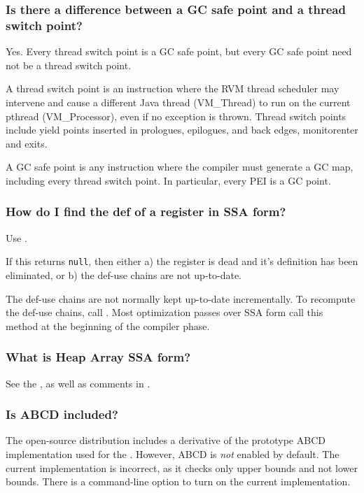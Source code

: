 \subsubsection{Is there a difference between a GC safe point and a thread
switch point?}

Yes.  Every thread switch point is a GC safe point, but every GC safe point 
need not be a thread switch point.

A thread switch point is an instruction where the RVM thread scheduler may
intervene and cause a different Java thread (VM\_Thread) to run on the current
pthread (VM\_Processor), even if no exception is thrown.  
Thread switch points include yield points inserted in prologues, epilogues, 
and back edges, monitorenter and exits.

A GC safe point is any instruction where the compiler must generate a GC map, 
including every thread switch point.  In particular, every 
PEI is a GC point.

\subsubsection{How do I find the def of a register in SSA form?}

Use 
.

If this returns {\tt null}, then either a) the register is dead and it's definition has been eliminated, or b) the def-use chains are not up-to-date.

The def-use chains are not normally kept up-to-date incrementally.  To
recompute the def-use chains, call 
. 
Most optimization passes over SSA form call this method at 
the beginning of the compiler phase.

\subsubsection{What is Heap Array SSA form?}

See the , as well as comments in
.

\subsubsection{Is ABCD included?}

The open-source distribution includes a derivative of the prototype ABCD 
implementation used for the 
.
However, ABCD is {\em not} enabled by default.  The current implementation
is incorrect, as it checks only upper bounds and not lower bounds.
There is a command-line option to turn on the current implementation.

